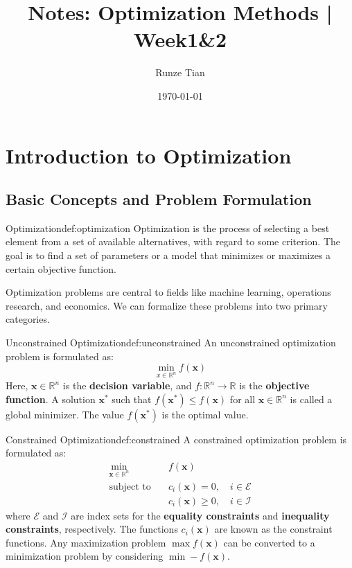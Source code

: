 \documentclass{MathNote}
\title{\textbf{Notes: Optimization Methods | Week1\&2}}
\author{Runze Tian}
\date{\today}
\begin{document}
\maketitle



\section{Introduction to Optimization}

\subsection{Basic Concepts and Problem Formulation}

\begin{definition}{Optimization}{def:optimization}
	Optimization is the process of selecting a best element from a set of available alternatives, with regard to some criterion. The goal is to find a set of parameters or a model that minimizes or maximizes a certain objective function.
\end{definition}

Optimization problems are central to fields like machine learning, operations research, and economics. We can formalize these problems into two primary categories.

\begin{definition}{Unconstrained Optimization}{def:unconstrained}
	An unconstrained optimization problem is formulated as:
	$$
	\min_{x \in \mathbb{R}^n} f(\bm{x})
	$$
	Here, $\bm{x} \in \mathbb{R}^n$ is the \textbf{decision variable}, and $f: \mathbb{R}^n \to \mathbb{R}$ is the \textbf{objective function}. A solution $\bm{x}^*$ such that $f(\bm{x}^*) \le f(\bm{x})$ for all $\bm{x} \in \mathbb{R}^n$ is called a global minimizer. The value $f(\bm{x}^*)$ is the optimal value.
\end{definition}

\begin{definition}{Constrained Optimization}{def:constrained}
	A constrained optimization problem is formulated as:
	\begin{align*}
	\min_{\bm{x} \in \mathbb{R}^n} \quad & f(\bm{x}) \\
	\text{subject to} \quad & c_i(\bm{x}) = 0, \quad i \in \mathcal{E} \\
	& c_i(\bm{x}) \ge 0, \quad i \in \mathcal{I}
	\end{align*}
	where $\mathcal{E}$ and $\mathcal{I}$ are index sets for the \textbf{equality constraints} and \textbf{inequality constraints}, respectively. The functions $c_i(\bm{x})$ are known as the constraint functions. Any maximization problem $\max f(\bm{x})$ can be converted to a minimization problem by considering $\min -f(\bm{x})$.
\end{definition}
\end{document}
